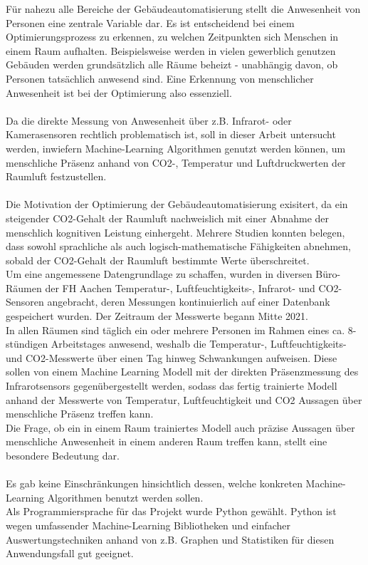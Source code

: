 Für nahezu alle Bereiche der Gebäudeautomatisierung stellt die Anwesenheit 
von Personen eine zentrale Variable dar. Es ist entscheidend bei einem Optimierungsprozess zu erkennen, zu
welchen Zeitpunkten sich Menschen in einem Raum aufhalten. Beispielsweise werden in vielen gewerblich 
genutzen Gebäuden werden grundsätzlich alle Räume beheizt - unabhängig davon, ob Personen tatsächlich anwesend sind. 
Eine Erkennung von menschlicher Anwesenheit ist bei der Optimierung also essenziell.\\\\
Da die direkte Messung von Anwesenheit über z.B. Infrarot- oder Kamerasensoren rechtlich problematisch ist, 
soll in dieser Arbeit untersucht werden, inwiefern Machine-Learning Algorithmen genutzt werden können, 
um menschliche Präsenz anhand von CO2-, Temperatur und Luftdruckwerten der Raumluft festzustellen.\\\\
Die Motivation der Optimierung der Gebäudeautomatisierung exisitert, da ein steigender CO2-Gehalt der 
Raumluft nachweislich mit einer Abnahme der menschlich kognitiven Leistung einhergeht. Mehrere Studien
konnten belegen, dass sowohl sprachliche als auch logisch-mathematische Fähigkeiten abnehmen, sobald 
der CO2-Gehalt der  Raumluft bestimmte Werte überschreitet.\\ 
Um eine angemessene Datengrundlage zu schaffen, wurden in diversen Büro-Räumen der FH Aachen Temperatur-,
Luftfeuchtigkeits-, Infrarot- und CO2-Sensoren angebracht, deren Messungen kontinuierlich auf einer Datenbank
gespeichert wurden. Der Zeitraum der Messwerte begann Mitte 2021.\\
In allen Räumen sind täglich ein oder mehrere
Personen im Rahmen eines ca. 8-stündigen Arbeitstages anwesend, weshalb die Temperatur-, Luftfeuchtigkeits-
und CO2-Messwerte über einen Tag hinweg Schwankungen aufweisen. Diese sollen von einem Machine Learning Modell
mit der direkten Präsenzmessung des Infrarotsensors gegenübergestellt werden, sodass das fertig trainierte Modell
anhand der Messwerte von Temperatur, Luftfeuchtigkeit und CO2 Aussagen über menschliche Präsenz treffen kann.\\
Die Frage, ob ein in einem Raum trainiertes Modell auch präzise Aussagen über menschliche Anwesenheit in einem anderen Raum
treffen kann, stellt eine besondere Bedeutung dar.\\\\
Es gab keine Einschränkungen hinsichtlich dessen, welche konkreten Machine-Learning Algorithmen 
benutzt werden sollen.\\
Als Programmiersprache für das Projekt wurde Python gewählt. Python ist wegen umfassender
Machine-Learning Bibliotheken und einfacher Auswertungstechniken anhand von z.B. Graphen und Statistiken 
für diesen Anwendungsfall gut geeignet.



